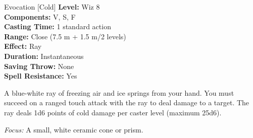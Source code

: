 {Evocation [Cold]}
{
	\textbf{Level:}
	Wiz 8\\
	\textbf{Components:}
	V, S, F\\
	\textbf{Casting Time:}
	1 standard action\\
	\textbf{Range:}
	Close (7.5 m + 1.5 m/2 levels)\\
	\textbf{Effect:}
	Ray\\
	\textbf{Duration:}
	Instantaneous\\
	\textbf{Saving Throw:}
	None\\
	\textbf{Spell Resistance:}
	Yes\\
}
{
	A blue-white ray of freezing air and ice springs from your hand. You must succeed on a ranged touch attack with the ray to deal damage to a target. The ray deals 1d6 points of cold damage per caster level (maximum 25d6).

	\textit{Focus:}
	A small, white ceramic cone or prism.

}
